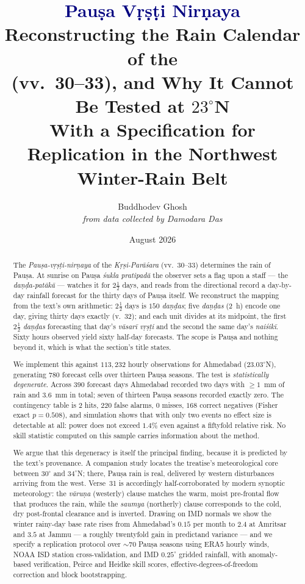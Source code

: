 \documentclass[11pt,a4paper]{article}
\title{\vspace{-1.5cm}
\textcolor{navy}{\Huge\bfseries Pauṣa Vṛṣṭi Nirṇaya}\\[6pt]
{\Large Reconstructing the \skt{daṇḍa-patākā} Rain Calendar of the\\
\skt{Kṛṣi-Parāśara} (vv.~30--33), and Why It Cannot Be Tested at $23^\circ$N}\\[6pt]
{\large With a Specification for Replication in the Northwest Winter-Rain Belt}}
\author{Buddhodev Ghosh\\[3pt]
{\small\itshape from data collected by Damodara Das}}
\date{\small August 2026}
\newcommand{\skt}[1]{\textcolor{skt}{\textit{#1}}}
\begin{document}
\maketitle
\thispagestyle{empty}

\begin{abstract}
\noindent
The \skt{Pauṣa-vṛṣṭi-nirṇaya} of the \skt{Kṛṣi-Parāśara} (vv.~30--33) determines the rain of Pauṣa. At sunrise on Pauṣa \skt{śukla pratipadā} the observer sets a flag upon a staff --- the \skt{daṇḍa-patākā} --- watches it for $2\tfrac{1}{2}$ days, and reads from the directional record a day-by-day rainfall forecast for the thirty days of Pauṣa itself. We reconstruct the mapping from the text's own arithmetic: $2\tfrac{1}{2}$ days is $150$ \skt{daṇḍas}; five \skt{daṇḍas} ($2$~h) encode one day, giving thirty days exactly (v.~32); and each unit divides at its midpoint, the first $2\tfrac{1}{2}$ \skt{daṇḍas} forecasting that day's \skt{vāsarī vṛṣṭi} and the second the same day's \skt{naiśikī}. Sixty hours observed yield sixty half-day forecasts. The scope is Pauṣa and nothing beyond it, which is what the section's title states.

We implement this against $113{,}232$ hourly observations for Ahmedabad ($23.03^\circ$N), generating $780$ forecast cells over thirteen Pauṣa seasons. The test is \emph{statistically degenerate}. Across $390$ forecast days Ahmedabad recorded two days with $\ge1$~mm of rain and $3.6$~mm in total; seven of thirteen Pauṣa seasons recorded exactly zero. The contingency table is $2$ hits, $220$ false alarms, $0$ misses, $168$ correct negatives (Fisher exact $p=0.508$), and simulation shows that with only two events no effect size is detectable at all: power does not exceed $1.4\%$ even against a fiftyfold relative risk. No skill statistic computed on this sample carries information about the method.

We argue that this degeneracy is itself the principal finding, because it is predicted by the text's provenance. A companion study locates the treatise's meteorological core between $30^\circ$ and $34^\circ$N; there, Pauṣa rain is real, delivered by western disturbances arriving from the west. Verse~31 is accordingly half-corroborated by modern synoptic meteorology: the \skt{vāruṇa} (westerly) clause matches the warm, moist pre-frontal flow that produces the rain, while the \skt{saumya} (northerly) clause corresponds to the cold, dry post-frontal clearance and is inverted. Drawing on IMD normals we show the winter rainy-day base rate rises from Ahmedabad's $0.15$ per month to $2.4$ at Amritsar and $3.5$ at Jammu --- a roughly twentyfold gain in predictand variance --- and we specify a replication protocol over $\sim$70 Pauṣa seasons using ERA5 hourly winds, NOAA ISD station cross-validation, and IMD $0.25^\circ$ gridded rainfall, with anomaly-based verification, Peirce and Heidke skill scores, effective-degrees-of-freedom correction and block bootstrapping.
\end{abstract}
\end{document}
